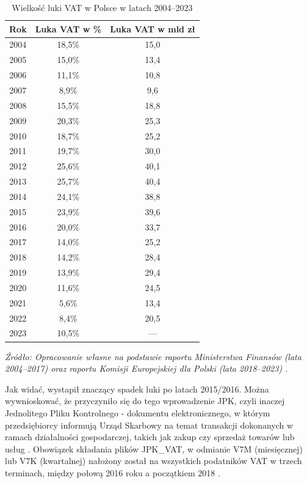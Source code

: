 \begin{table}[H]
    \centering
    \caption{Wielkość luki VAT w Polsce w latach 2004--2023}
    \label{tab:luka_vat_full}
    \renewcommand{\arraystretch}{1.2} 
    
    \begin{tabular}{ccc}
    \toprule
    \textbf{Rok} & \textbf{Luka VAT w \%} & \textbf{Luka VAT w mld zł} \\ 
    \midrule
    2004 & 18,5\% & 15,0 \\
    2005 & 15,0\% & 13,4 \\
    2006 & 11,1\% & 10,8 \\
    2007 & 8,9\%  & 9,6  \\
    2008 & 15,5\% & 18,8 \\
    2009 & 20,3\% & 25,3 \\
    2010 & 18,7\% & 25,2 \\
    2011 & 19,7\% & 30,0 \\
    2012 & 25,6\% & 40,1 \\
    2013 & 25,7\% & 40,4 \\
    2014 & 24,1\% & 38,8 \\
    2015 & 23,9\% & 39,6 \\
    2016 & 20,0\% & 33,7 \\
    2017 & 14,0\% & 25,2 \\
    
    \midrule[0.05pt] 
    2018 & 14,2\% & 28,4 \\
    2019 & 13,9\% & 29,4 \\
    2020 & 11,6\% & 24,5 \\
    2021 & 5,6\%  & 13,4 \\
    2022 & 8,4\%  & 20,5 \\
    2023 & 10,5\% & ---\\ 
    \bottomrule 
    \end{tabular}
    
    \vspace{0.2cm}
    \raggedright
    \footnotesize{
    \textit{Źródło: Opracowanie własne na podstawie raportu Ministerstwa Finansów (lata 2004--2017) \parencite{mf_raport_luka_2019} oraz raportu Komisji Europejskiej dla Polski (lata 2018--2023) \parencite{vat_gap_poland_2025}.}
    }
\end{table}

Jak widać, wystapił znaczący spadek luki po latach 2015/2016. Można wywnioskować, że przyczyniło się do tego wprowadzenie JPK, czyli inaczej Jednolitego Pliku Kontrolnego - dokumentu elektronicznego, w którym przedsiębiorcy informują Urząd Skarbowy na temat transakcji dokonanych w ramach działalności gospodarczej, takich jak zakup czy sprzedaż towarów lub usług \parencite{mf_jpk_informacje}. Obowiązek składania plików JPK\_VAT, w odmianie V7M (miesięcznej) lub V7K (kwartalnej) \parencite{zebrowska-fresenbet_jpk_2021} nałożony został na wszystkich podatników VAT w trzech terminach, między połową 2016 roku a początkiem 2018 \parencite{mf_jpk_informacje}.

